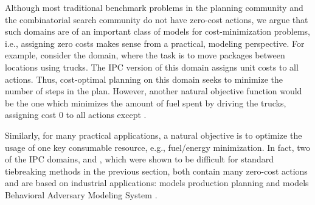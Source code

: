 
Although most traditional benchmark problems in the planning community and the combinatorial search community do not have zero-cost actions,
we argue that such domains are of an important class of models for cost-minimization problems, i.e.,
assigning zero costs makes sense from a practical, modeling perspective.
For example, consider the  domain, where the task is to move packages between locations using trucks.
The IPC version of this domain assigns unit costs to all actions. Thus, cost-optimal planning on this domain seeks to minimize the number of steps in the plan.
However, another natural objective function would be the one which minimizes the amount of fuel spent by driving the trucks,
assigning cost 0 to all actions except .


Similarly, for many practical applications, a natural objective is to
optimize the usage of one key consumable resource, e.g., fuel/energy
minimization.  In fact, two of the IPC domains,  and
, which were shown to be difficult for standard tiebreaking
methods in the previous section, both contain many zero-cost actions
and are based on industrial applications: %
 models
production planning \cite{fink1999applications} and 
models Behavioral Adversary Modeling System \cite[minimizing decryption,
data transfer, etc.]{boddy2005course}.


